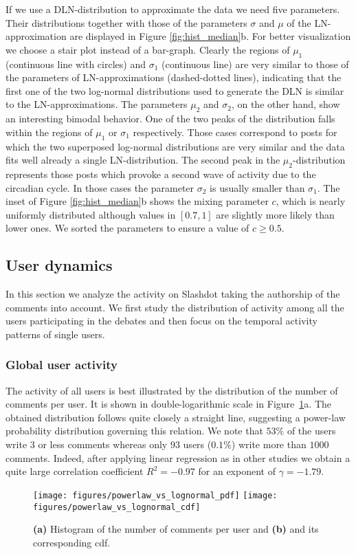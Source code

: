 \documentclass[twoside,11pt]{article}
\begin{document}
If we use a DLN-distribution to approximate the data we need five
parameters. Their distributions together with those of the parameters
$\sigma$ and $\mu$ of the LN-approximation are displayed in Figure
\ref{fig:hist_median}b. For better visualization we choose a stair
plot instead of a bar-graph. Clearly the regions of $\mu_1$
(continuous line with circles) and $\sigma_1$ (continuous line) are
very similar to those of the parameters of LN-approximations
(dashed-dotted lines), indicating that the first one of the two
log-normal distributions used to generate the DLN is similar to the
LN-approximations.  The parameters $\mu_2$ and $\sigma_2$, on the
other hand, show an interesting bimodal behavior.  One of the two
peaks of the distribution falls within the regions of $\mu_1$ or
$\sigma_1$ respectively. Those cases correspond to posts for which the
two superposed log-normal distributions are very similar and the data
fits well already a single LN-distribution.  The second peak in the
$\mu_2$-distribution represents those posts which provoke a second
wave of activity due to the circadian cycle.  In those cases the
parameter $\sigma_2$ is usually smaller than $\sigma_1$.  The inset of
Figure \ref{fig:hist_median}b shows the mixing parameter $c$, which is
nearly uniformly distributed although values in $[0.7,1]$ are slightly
more likely than lower ones.  We sorted the parameters to ensure a
value of $c\geq0.5$.

\subsection{User dynamics}\noindent
In this section we analyze the activity on Slashdot taking the
authorship of the comments into account. We first study the
distribution of activity among all the users participating in the
debates and then focus on the temporal activity patterns of single
users.

\subsubsection{Global user activity} \noindent 
The activity of all users is best illustrated by the distribution of
the number of comments per user. It is shown in double-logarithmic
scale in Figure~\ref{fig:powerlaw}a.  The obtained distribution
follows quite closely a straight line, suggesting a power-law
probability distribution governing this relation.  We note that $53\%$
of the users write $3$ or less comments whereas only $93$ users
($0.1\%$) write more than $1000$ comments.  Indeed, after applying
linear regression as in other studies
\citep{faloutsos1999, barabasi1999} we obtain a quite large correlation
coefficient $R^{2}=-0.97$ for an exponent of $\gamma = -1.79$.
\begin{figure}[!t]\centering
  \texttt{[image: figures/powerlaw\_vs\_lognormal\_pdf]}
  \texttt{[image: figures/powerlaw\_vs\_lognormal\_cdf]}
  \caption{\textbf{(a)} Histogram of the number of comments per user
    and \textbf{(b)} and its corresponding cdf.}
\label{fig:powerlaw}
\end{figure}
\end{document}
